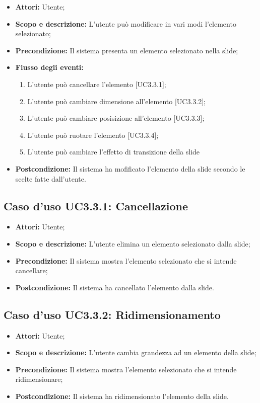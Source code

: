 \begin{itemize}
	\item \textbf{Attori:} Utente;
	\item \textbf{Scopo e descrizione:} L'utente può modificare in vari modi l'elemento selezionato;
	\item \textbf{Precondizione:} Il sistema presenta un elemento selezionato nella slide;
	\item \textbf{Flusso degli eventi:}
	\begin{enumerate}
		\item L'utente può cancellare l'elemento [UC3.3.1];
		\item L'utente può cambiare dimensione all'elemento [UC3.3.2];
		\item L'utente può cambiare posisizione all'elemento [UC3.3.3];
		\item L'utente può ruotare l'elemento [UC3.3.4];
		\item L'utente può cambiare l'effetto di transizione della slide
	\end{enumerate}
	\item \textbf{Postcondizione:} Il sistema ha mofificato l'elemento della slide secondo le scelte fatte dall'utente.
\end{itemize}

\subsection{Caso d'uso UC3.3.1: Cancellazione}
\begin{itemize}
	\item \textbf{Attori:} Utente;
	\item \textbf{Scopo e descrizione:} L'utente elimina un elemento selezionato dalla slide;
	\item \textbf{Precondizione:} Il sistema mostra l'elemento selezionato che si intende cancellare;
	\item \textbf{Postcondizione:} Il sistema ha cancellato l'elemento dalla slide.
\end{itemize}

\subsection{Caso d'uso UC3.3.2: Ridimensionamento}
\begin{itemize}
	\item \textbf{Attori:} Utente;
	\item \textbf{Scopo e descrizione:} L'utente cambia grandezza ad un elemento della slide;
	\item \textbf{Precondizione:} Il sistema mostra l'elemento selezionato che si intende ridimensionare;
	\item \textbf{Postcondizione:} Il sistema ha ridimensionato l'elemento della slide.
\end{itemize}

